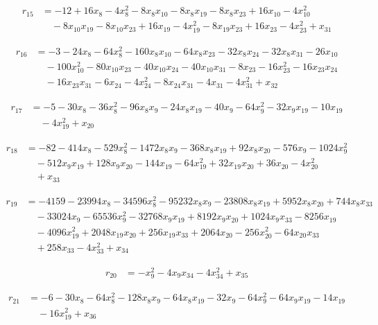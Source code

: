 \begin{align*}
r_{15}&=-12+16x_{8}-4x_{8}^{2}-8x_{8}x_{10}-8x_{8}x_{19}-8x_{8}x_{23}+16x_{10}-4x_{10}^{2}\\
&\quad -8x_{10}x_{19}-8x_{10}x_{23}+16x_{19}-4x_{19}^{2}-8x_{19}x_{23}+16x_{23}-4x_{23}^{2}+x_{31}
\end{align*}

\begin{align*}
r_{16}&=-3-24x_{8}-64x_{8}^{2}-160x_{8}x_{10}-64x_{8}x_{23}-32x_{8}x_{24}-32x_{8}x_{31}-26x_{10}\\
&\quad -100x_{10}^{2}-80x_{10}x_{23}-40x_{10}x_{24}-40x_{10}x_{31}-8x_{23}-16x_{23}^{2}-16x_{23}x_{24}\\
&\quad -16x_{23}x_{31}-6x_{24}-4x_{24}^{2}-8x_{24}x_{31}-4x_{31}-4x_{31}^{2}+x_{32}
\end{align*}

\begin{align*}
r_{17}&=-5-30x_{8}-36x_{8}^{2}-96x_{8}x_{9}-24x_{8}x_{19}-40x_{9}-64x_{9}^{2}-32x_{9}x_{19}-10x_{19}\\
&\quad -4x_{19}^{2}+x_{20}
\end{align*}

\begin{align*}
r_{18}&=-82-414x_{8}-529x_{8}^{2}-1472x_{8}x_{9}-368x_{8}x_{19}+92x_{8}x_{20}-576x_{9}-1024x_{9}^{2}\\
&\quad -512x_{9}x_{19}+128x_{9}x_{20}-144x_{19}-64x_{19}^{2}+32x_{19}x_{20}+36x_{20}-4x_{20}^{2}\\
&\quad +x_{33}
\end{align*}

\begin{align*}
r_{19}&=-4159-23994x_{8}-34596x_{8}^{2}-95232x_{8}x_{9}-23808x_{8}x_{19}+5952x_{8}x_{20}+744x_{8}x_{33}\\
&\quad -33024x_{9}-65536x_{9}^{2}-32768x_{9}x_{19}+8192x_{9}x_{20}+1024x_{9}x_{33}-8256x_{19}\\
&\quad -4096x_{19}^{2}+2048x_{19}x_{20}+256x_{19}x_{33}+2064x_{20}-256x_{20}^{2}-64x_{20}x_{33}\\
&\quad +258x_{33}-4x_{33}^{2}+x_{34}
\end{align*}

\begin{align*}
r_{20}&=-x_{9}^{2}-4x_{9}x_{34}-4x_{34}^{2}+x_{35}
\end{align*}

\begin{align*}
r_{21}&=-6-30x_{8}-64x_{8}^{2}-128x_{8}x_{9}-64x_{8}x_{19}-32x_{9}-64x_{9}^{2}-64x_{9}x_{19}-14x_{19}\\
&\quad -16x_{19}^{2}+x_{36}
\end{align*}

